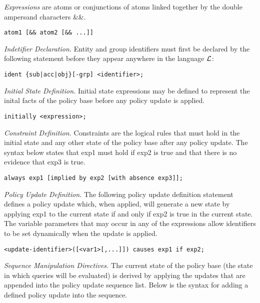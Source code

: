 \documentclass{llncs}
\begin{document}
    \emph{Expressions} are atoms or conjunctions of atoms linked together by
    the double ampersand characters \&\&.

    \begin{verbatim}atom1 [&& atom2 [&& ...]]\end{verbatim}

    \emph{Indetifier Declaration.} Entity and group identifiers must first be
    declared by the following statement before they appear anywhere in the
    language $\cal{L}$:

    \begin{verbatim}ident {sub|acc|obj}[-grp] <identifier>;\end{verbatim}

    \emph{Initial State Definition.} Initial state expressions may be defined
    to represent the inital facts of the policy base before any policy update
    is applied.

    \begin{verbatim}initially <expression>;\end{verbatim}

    \emph{Constraint Definition.} Constraints are the logical rules that must
    hold in the initial state and any other state of the policy base after
    any policy update. The syntax below states that exp1 must hold if exp2 is 
    true and that there is no evidence that exp3 is true.

    \begin{verbatim}always exp1 [implied by exp2 [with absence exp3]];\end{verbatim}

    \emph{Policy Update Definition.} The following policy update definition
    statement defines a policy update which, when applied, will generate a new
    state by applying exp1 to the current state if and only if exp2 is true in
    the current state. The variable parameters that may occur in any of the
    expressions allow identifiers to be set dynamically when the update is
    applied.

    \begin{verbatim}<update-identifier>([<var1>[,...]]) causes exp1 if exp2;\end{verbatim}

    \emph{Sequence Manipulation Directives.} The current state of the policy
    base (the state in which queries will be evaluated) is derived by applying
    the updates that are appended into the policy update sequence list. Below
    is the syntax for adding a defined policy update into the sequence.
\end{document}
